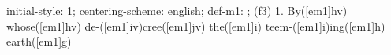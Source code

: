 initial-style: 1;
centering-scheme: english;
def-m1: \grealign;
(f3) 1. By([em1]hv) whose([em1]hv) de-([em1]iv)cree([em1]jv) the([em1]i) teem-([em1]i)ing([em1]h) earth([em1]g)